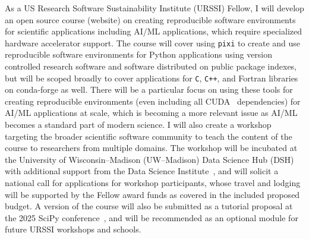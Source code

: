 \documentclass[letterpaper, 11pt]{article}
\newcommand{\institute}{UW--Madison}
\newcommand{\fullinstitute}{University of Wisconsin--Madison}
\newcommand{\fullprogram}{US Research Software Sustainability Institute}
\newcommand{\program}{URSSI}
\newcommand{\pixi}{\texttt{pixi}}
\begin{document}
As a \fullprogram{} (\program{}) Fellow, I will develop an open source course (website) on creating reproducible software environments for scientific applications including AI/ML applications, which require specialized hardware accelerator support.
The course will cover using \pixi{} to create and use reproducible software environments for Python applications using version controlled research software and software distributed on public package indexes, but will be scoped broadly to cover applications for \texttt{C}, \texttt{C++}, and Fortran libraries on conda-forge as well.
There will be a particular focus on using these tools for creating reproducible environments (even including all CUDA~\cite{CUDA_paper} dependencies) for AI/ML applications at scale, which is becoming a more relevant issue as AI/ML becomes a standard part of modern science.
I will also create a workshop targeting the broader scientific software community to teach the content of the course to researchers from multiple domains.
The workshop will be incubated at the \fullinstitute{} (\institute{}) Data Science Hub (DSH)~\cite{data_science_hub} with additional support from the Data Science Institute~\cite{uwmadison_dsi}, and will solicit a national call for applications for workshop participants, whose travel and lodging will be supported by the Fellow award funds as covered in the included proposed budget.
A version of the course will also be submitted as a tutorial proposal at the 2025 SciPy conference~\cite{scipy-2025}, and will be recommended as an optional module for future URSSI workshops and schools.
%
\end{document}

